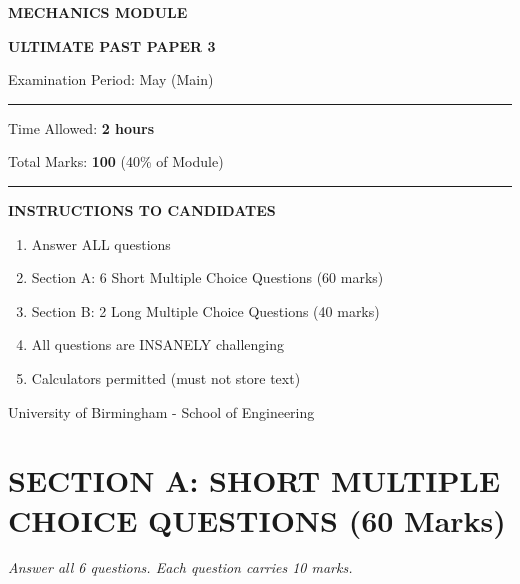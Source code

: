 \documentclass[12pt,a4paper]{article}
\begin{document}
\begin{titlepage}
    \centering
    \vspace*{2cm}
    {\Huge\bfseries\color{examblue}MECHANICS MODULE}\par
    \vspace{0.5cm}
    {\Large\bfseries ULTIMATE PAST PAPER 3}\par
    \vspace{1.5cm}
    {\large Examination Period: May (Main)}\par
    \vspace{0.5cm}
    \rule{\linewidth}{2pt}\par
    \vspace{1cm}
    {\Large Time Allowed: \textbf{2 hours}}\par
    \vspace{0.5cm}
    {\Large Total Marks: \textbf{100} (40\% of Module)}\par
    \vspace{1.5cm}
    \rule{\linewidth}{1pt}\par
    \vspace{1cm}
    {\large\bfseries INSTRUCTIONS TO CANDIDATES}\par
    \vspace{0.5cm}
    \begin{minipage}{0.8\linewidth}
        \begin{enumerate}[label=\textbf{\arabic*.},leftmargin=*]
            \item Answer ALL questions
            \item Section A: 6 Short Multiple Choice Questions (60 marks)
            \item Section B: 2 Long Multiple Choice Questions (40 marks)
            \item All questions are INSANELY challenging
            \item Calculators permitted (must not store text)
        \end{enumerate}
    \end{minipage}
    \vfill
    {\small University of Birmingham - School of Engineering}\par
\end{titlepage}

\newpage
\section*{SECTION A: SHORT MULTIPLE CHOICE QUESTIONS (60 Marks)}
{\large\itshape Answer all 6 questions. Each question carries 10 marks.}
\vspace{0.5cm}
\end{document}
